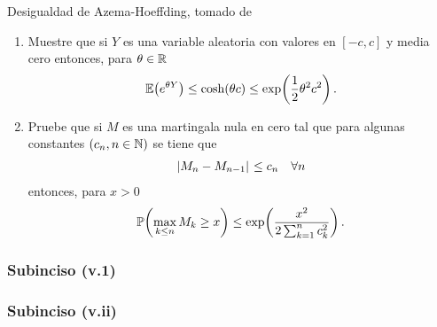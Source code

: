 Desigualdad de Azema-Hoeffding, tomado de \cite[E14.2, p.237]{MR1155402}
\begin{enumerate}
	\item[(v.i)]	[\ref{problema2_3:subinciso5_1}]
	 	Muestre que si $Y$ es una variable aleatoria con valores en $[-c,c]$ y media cero entonces, para $\theta\in\mathbb{R}$
		\begin{align}
			\mathbb{E}\! \left( e^{\theta Y} \right)\leq\cosh\!\left( \theta c\right) \leq \exp\!\left( \frac{1}{2}\theta^2c^2\right) . 
		\end{align}

	\item[(v.ii)]	[\ref{problema2_3:subinciso5_2}]
		Pruebe que si $M$ es una martingala nula en cero tal que para algunas constantes $\left( c_n,n\in\mathbb{N}\right) $ se tiene que
		\begin{align}
			\hspace{.25mm}\left|M_n-M_{n-1}\right|\hspace{.25mm}\leq c_n\quad\forall n
		\end{align}
		entonces, para $x>0$
		\begin{align}
			\mathbb{P}\! \left( \max_{k\leq n} M_k\geq x \right)\leq \exp\!\left( \frac{x^2}{2\sum_{k=1}^n c_k^2}\right) .
		\end{align}
\end{enumerate}
	
\subsubsection{Subinciso (v.1)} 	\label{problema2_3:subinciso5_1}
	
	\newpage
	
\subsubsection{Subinciso (v.ii)}	\label{problema2_3:subinciso5_2} 
	

